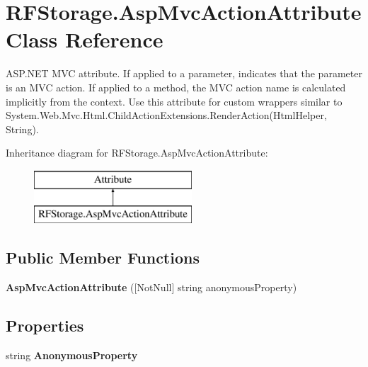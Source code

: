 \hypertarget{class_r_f_storage_1_1_asp_mvc_action_attribute}{}\section{R\+F\+Storage.\+Asp\+Mvc\+Action\+Attribute Class Reference}
\label{class_r_f_storage_1_1_asp_mvc_action_attribute}


A\+S\+P.\+N\+ET M\+VC attribute. If applied to a parameter, indicates that the parameter is an M\+VC action. If applied to a method, the M\+VC action name is calculated implicitly from the context. Use this attribute for custom wrappers similar to {\ttfamily System.\+Web.\+Mvc.\+Html.\+Child\+Action\+Extensions.\+Render\+Action(\+Html\+Helper, String)}.  


Inheritance diagram for R\+F\+Storage.\+Asp\+Mvc\+Action\+Attribute\+:\begin{figure}[H]
\begin{center}
\leavevmode
\includegraphics[height=2.000000cm]{class_r_f_storage_1_1_asp_mvc_action_attribute}
\end{center}
\end{figure}
\subsection*{Public Member Functions}
\begin{DoxyCompactItemize}
\item 
\mbox{\label{class_r_f_storage_1_1_asp_mvc_action_attribute_af179ac7728f9ff9ae77906d75fc04ce1}} 
{\bfseries Asp\+Mvc\+Action\+Attribute} (\mbox{[}Not\+Null\mbox{]} string anonymous\+Property)
\end{DoxyCompactItemize}
\subsection*{Properties}
\begin{DoxyCompactItemize}
\item 
\mbox{\label{class_r_f_storage_1_1_asp_mvc_action_attribute_a490eb3c26695fa88f66c7b9f1fe3f038}} 
string {\bfseries Anonymous\+Property}
\end{DoxyCompactItemize}


